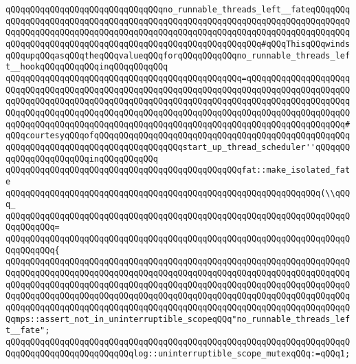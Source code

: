 \verb|qQQqqQQqqQQqqQQqqQQqqQQqqQQqqQQqno_runnable_threads_left__fateqQQqqQQqqQQqqQQqqQQqqQQqqQQqqQQqqQQqqQQqqQQqqQQqqQQqqQQqqQQqqQQqqQQqqQQqqQQqqQQqqQQqqQQqqQQqqQQqqQQqqQQqqQQqqQQqqQQqqQQqqQQqqQQqqQQqqQQqqQQqqQQqqQQqqQQqqQQqqQQqqQQqqQQqqQQqqQQqqQQqqQQqqQQqqQQqqQQqqQQq#qQQqThisqQQqwindsqQQqupqQQqasqQQqtheqQQqvalueqQQqforqQQqqQQqqQQqno_runnable_threads_left__hookqQQqqQQqqQQqinqQQqqQQqqQQq|\newline
\verb|qQQqqQQqqQQqqQQqqQQqqQQqqQQqqQQqqQQqqQQqqQQqqQQq=qQQqqQQqqQQqqQQqqQQqqQQqqQQqqQQqqQQqqQQqqQQqqQQqqQQqqQQqqQQqqQQqqQQqqQQqqQQqqQQqqQQqqQQqqQQqqQQqqQQqqQQqqQQqqQQqqQQqqQQqqQQqqQQqqQQqqQQqqQQqqQQqqQQqqQQqqQQqqQQqqQQqqQQqqQQqqQQqqQQqqQQqqQQqqQQqqQQqqQQqqQQqqQQqqQQqqQQqqQQqqQQqqQQqqQQqqQQqqQQqqQQqqQQqqQQqqQQqqQQqqQQqqQQqqQQqqQQqqQQqqQQqqQQqqQQqqQQqqQQq#qQQqcourtesyqQQqofqQQqqQQqqQQqqQQqqQQqqQQqqQQqqQQqqQQqqQQqqQQqqQQqqQQqqQQqqQQqqQQqqQQqqQQqqQQqqQQqqQQqqQQqstart_up_thread_scheduler''qQQqqQQqqQQqqQQqqQQqqQQqinqQQqqQQqqQQq|\newline
\verb|qQQqqQQqqQQqqQQqqQQqqQQqqQQqqQQqqQQqqQQqqQQqqQQqfat::make_isolated_fate|\newline
\verb|qQQqqQQqqQQqqQQqqQQqqQQqqQQqqQQqqQQqqQQqqQQqqQQqqQQqqQQqqQQqqQQq(\\qQQq_|\newline
\verb|qQQqqQQqqQQqqQQqqQQqqQQqqQQqqQQqqQQqqQQqqQQqqQQqqQQqqQQqqQQqqQQqqQQqqQQqqQQqqQQq=|\newline
\verb|qQQqqQQqqQQqqQQqqQQqqQQqqQQqqQQqqQQqqQQqqQQqqQQqqQQqqQQqqQQqqQQqqQQqqQQqqQQqqQQq{|\newline
\verb|qQQqqQQqqQQqqQQqqQQqqQQqqQQqqQQqqQQqqQQqqQQqqQQqqQQqqQQqqQQqqQQqqQQqqQQqqQQqqQQqqQQqqQQqqQQqqQQqqQQqqQQqqQQqqQQqqQQqqQQqqQQqqQQqqQQqqQQqqQQqqQQqqQQqqQQqqQQqqQQqqQQqqQQqqQQqqQQqqQQqqQQqqQQqqQQqqQQqqQQqqQQqqQQqqQQqqQQqqQQqqQQqqQQqqQQqqQQqqQQqqQQqqQQqqQQqqQQqqQQqqQQqqQQqqQQqqQQqqQQqqQQqqQQqqQQqqQQqqQQqqQQqqQQqqQQqqQQqqQQqqQQqqQQqqQQqqQQqqQQqqQQqqQQqqQQqmps::assert_not_in_uninterruptible_scopeqQQq"no_runnable_threads_left__fate";|\newline
\verb|qQQqqQQqqQQqqQQqqQQqqQQqqQQqqQQqqQQqqQQqqQQqqQQqqQQqqQQqqQQqqQQqqQQqqQQqqQQqqQQqqQQqqQQqqQQqqQQqlog::uninterruptible_scope_mutexqQQq:=qQQq1;|\newline
